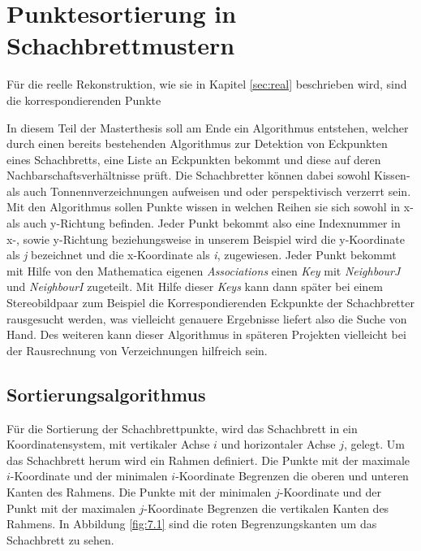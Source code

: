 \chapter{Punktesortierung in Schachbrettmustern}
\label{sec:schachbrettAlg} 


Für die reelle Rekonstruktion, wie sie in Kapitel \ref{sec:real} beschrieben wird, sind die korrespondierenden Punkte


In diesem Teil der Masterthesis soll am Ende ein Algorithmus entstehen, welcher durch einen bereits bestehenden Algorithmus zur Detektion von Eckpunkten eines Schachbretts, eine Liste an Eckpunkten bekommt und diese auf deren Nachbarschaftsverhältnisse prüft. Die Schachbretter können dabei sowohl Kissen- als auch Tonnennverzeichnungen aufweisen und oder perspektivisch verzerrt sein. Mit den Algorithmus sollen Punkte wissen in welchen Reihen sie sich sowohl in x- als auch y-Richtung befinden. Jeder Punkt bekommt also eine Indexnummer in x-, sowie y-Richtung beziehungsweise in unserem Beispiel wird die y-Koordinate als \textit{j} bezeichnet und die x-Koordinate als \textit{i}, zugewiesen. Jeder Punkt bekommt mit Hilfe von den Mathematica eigenen \textit{Associations} einen \textit{Key} mit \textit{NeighbourJ} und \textit{NeighbourI} zugeteilt. Mit Hilfe dieser \textit{Keys} kann dann später bei einem Stereobildpaar zum Beispiel die Korrespondierenden Eckpunkte der Schachbretter rausgesucht werden, was vielleicht genauere Ergebnisse liefert also die Suche von Hand. Des weiteren kann dieser Algorithmus in späteren Projekten vielleicht bei der Rausrechnung von Verzeichnungen hilfreich sein.\\


\section{Sortierungsalgorithmus}

Für die Sortierung der Schachbrettpunkte, wird das Schachbrett in ein Koordinatensystem, mit vertikaler Achse $i$ und horizontaler Achse $j$, gelegt. Um das Schachbrett herum wird ein Rahmen definiert. Die Punkte mit der maximale $i$-Koordinate und der minimalen $i$-Koordinate Begrenzen die oberen und unteren Kanten des Rahmens. Die Punkte mit der minimalen $j$-Koordinate und der Punkt mit der  maximalen $j$-Koordinate Begrenzen die vertikalen Kanten des Rahmens. In Abbildung \ref{fig:7.1} sind die roten Begrenzungskanten um das Schachbrett zu sehen.\\

